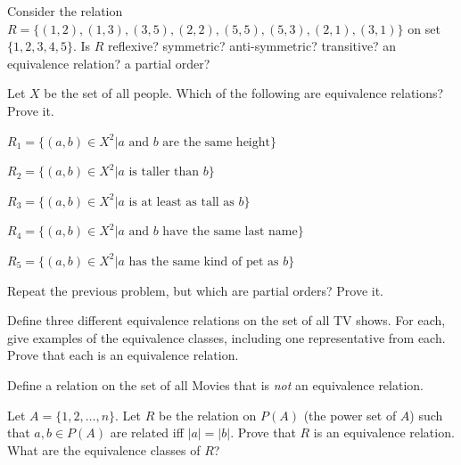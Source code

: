 \newpage
\begin{pro}
\item 
Consider the relation 
$R=\{(1,2), (1,3), (3,5), (2,2), (5,5), (5,3), (2,1), (3,1)  \}$ on set $\{1,2,3,4,5\}$.
Is $R$ reflexive? symmetric? anti-symmetric? transitive?
an equivalence relation? a partial order?
\end{pro}

\begin{pro}
Let $X$ be the set of all people.
Which of the following are equivalence relations?  Prove it.
\begin{lenum}
\item
$R_1=\{(a,b)\in X^2 | a \mbox{ and } b \mbox{ are the same height} \}$
\item
$R_2=\{(a,b)\in X^2 | a \mbox{ is taller than } b \}$
\item
$R_3=\{(a,b)\in X^2 | a \mbox{ is at least as tall as } b \}$
\item
$R_4=\{(a,b)\in X^2 | a \mbox{ and } b \mbox{ have the same last name} \}$
\item
$R_5=\{(a,b)\in X^2 | a \mbox{ has the same kind of pet as } b \}$
\end{lenum}
\end{pro}

\begin{pro}
Repeat the previous problem, but which are partial orders?  Prove it.
\end{pro}

\begin{pro}
Define three different equivalence relations on the set of all TV shows.
For each, give examples of the equivalence classes, 
including one representative from each.  Prove that each is an 
equivalence relation.
\end{pro}

\begin{pro}
Define a relation on the set of all Movies that is {\em not} an equivalence relation.
\end{pro}

\begin{pro}
Let $A=\{1, 2, \ldots, n\}$.  Let $R$ be the relation on $P(A)$ (the power set of $A$)
such that $a,b\in P(A)$ are related iff $|a|=|b|$.  Prove that $R$ is an equivalence relation.
What are the equivalence classes of $R$?
\end{pro}


